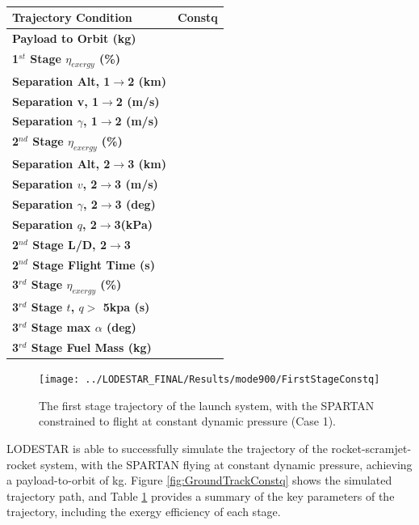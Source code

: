\begin{table}[ht]
	\centering
	
	
	\begin{tabular}{l c } 
		\hline \textbf{Trajectory Condition}
		&Constq
		\\
		\hline \textbf{Payload to Orbit (kg)}
		& \textbf{\PayloadToOrbitConstq}
		\\
		\hline \textbf{1$^{st}$ Stage $\eta_{exergy}$ (\%)}
		& \textbf{\firstExergyEffConstq}
		\\
		\textbf{Separation Alt, 1$\rightarrow$2 (km)}
		& \firstsecondSeparationAltConstq
		\\
		\textbf{Separation v, 1$\rightarrow$2 (m/s)}
		& \firstsecondSeparationvConstq
		\\
		\textbf{Separation $\gamma$, 1$\rightarrow$2 (m/s)}
		& \firstsecondSeparationgammaConstq
		\\
		\hline 
		\textbf{2$^{nd}$ Stage $\eta_{exergy}$ (\%)}
		& \textbf{\secondExergyEffConstq}
		\\
		\textbf{Separation Alt, 2$\rightarrow$3 (km)}
		& \secondthirdSeparationAltConstq
		\\
		\textbf{Separation $v$, 2$\rightarrow$3 (m/s)}
		& \secondthirdSeparationvConstq
		\\
		\textbf{Separation $\gamma$, 2$\rightarrow$3 (deg)}
		& \secondthirdSeparationgammaConstq
		\\
		\textbf{Separation $q$, 2$\rightarrow$3(kPa)}
		& \secondthirdSeparationqConstq
		\\
		\textbf{2$^{nd}$ Stage L/D, 2$\rightarrow$3}
		& \secondthirdSeparationLDConstq
		\\
		\textbf{2$^{nd}$ Stage Flight Time (s)}
		& \secondFlightTimeConstq
		\\
		\hline 
		\textbf{3$^{rd}$ Stage $\eta_{exergy}$ (\%)}
		& \textbf{\thirddExergyEffConstq}
		\\
		\textbf{3$^{rd}$ Stage $t$, $q >$ 5kpa (s)}
		& \thirdqOverFiveConstq
		\\
		\textbf{3$^{rd}$ Stage max $\alpha$ (deg)}
		& \thirdmaxAoAConstq
		\\
		\textbf{3$^{rd}$ Stage Fuel Mass (kg)}
		& \thirdmFuelConstq
		\\
		\hline 
	\end{tabular} 
	\caption{}
	\label{tab:constqsummary}
\end{table}
\begin{figure}[ht!]
	\centering
	\texttt{[image: ../LODESTAR\_FINAL/Results/mode900/FirstStageConstq]}
	\caption{The first stage trajectory of the launch system, with the SPARTAN constrained to flight at constant dynamic pressure (Case 1).}
	\label{fig:FirstStageConstq}
\end{figure}
LODESTAR is able to successfully simulate the trajectory of the rocket-scramjet-rocket system, with the SPARTAN flying at constant dynamic pressure, achieving a payload-to-orbit of \PayloadToOrbitConstq kg.
Figure \ref{fig:GroundTrackConstq} shows the simulated trajectory path, and Table \ref{tab:constqsummary} provides a summary of the key parameters of the trajectory, including the exergy efficiency of each stage.


